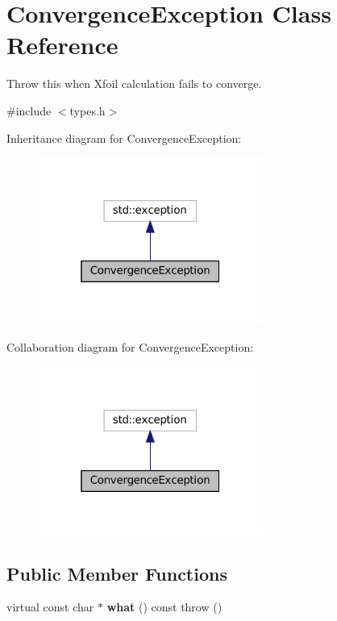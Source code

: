 \hypertarget{classConvergenceException}{}\section{Convergence\+Exception Class Reference}
\label{classConvergenceException}


Throw this when Xfoil calculation fails to converge.  




{\ttfamily \#include $<$types.\+h$>$}



Inheritance diagram for Convergence\+Exception\+:
\nopagebreak
\begin{figure}[H]
\begin{center}
\leavevmode
\includegraphics[width=208pt]{classConvergenceException__inherit__graph}
\end{center}
\end{figure}


Collaboration diagram for Convergence\+Exception\+:
\nopagebreak
\begin{figure}[H]
\begin{center}
\leavevmode
\includegraphics[width=208pt]{classConvergenceException__coll__graph}
\end{center}
\end{figure}
\subsection*{Public Member Functions}
\begin{DoxyCompactItemize}
\item 
\mbox{\label{classConvergenceException_a316e0101d86b3df281451159d68bac38}} 
virtual const char $\ast$ {\bfseries what} () const  throw ()
\end{DoxyCompactItemize}


